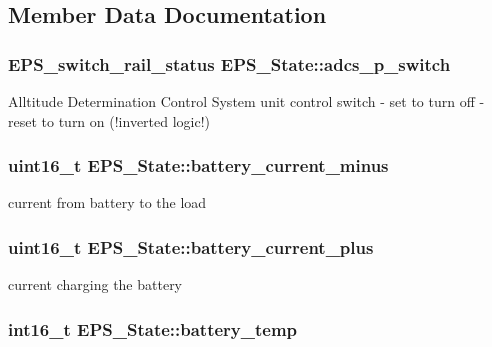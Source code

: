 \subsection{Member Data Documentation}
\hypertarget{struct_e_p_s___state_abe97647e722ffb5a4f04eb99dfe11b75}{
\subsubsection[{adcs\-\_\-p\-\_\-switch}]{\setlength{\rightskip}{0pt plus 5cm}E\-P\-S\-\_\-switch\-\_\-rail\-\_\-status E\-P\-S\-\_\-\-State\-::adcs\-\_\-p\-\_\-switch}}\label{struct_e_p_s___state_abe97647e722ffb5a4f04eb99dfe11b75}
Alltitude Determination Control System unit control switch -\/ set to turn off -\/ reset to turn on (!inverted logic!) \hypertarget{struct_e_p_s___state_ad3b15bd99dc275cedebc984e63fd1838}{
\subsubsection[{battery\-\_\-current\-\_\-minus}]{\setlength{\rightskip}{0pt plus 5cm}uint16\-\_\-t E\-P\-S\-\_\-\-State\-::battery\-\_\-current\-\_\-minus}}\label{struct_e_p_s___state_ad3b15bd99dc275cedebc984e63fd1838}
current from battery to the load \hypertarget{struct_e_p_s___state_aa252bb52b29b61764a4922003a6f2f10}{
\subsubsection[{battery\-\_\-current\-\_\-plus}]{\setlength{\rightskip}{0pt plus 5cm}uint16\-\_\-t E\-P\-S\-\_\-\-State\-::battery\-\_\-current\-\_\-plus}}\label{struct_e_p_s___state_aa252bb52b29b61764a4922003a6f2f10}
current charging the battery \hypertarget{struct_e_p_s___state_a4df91df2e72e6b2a80770a699f329781}{
\subsubsection[{battery\-\_\-temp}]{\setlength{\rightskip}{0pt plus 5cm}int16\-\_\-t E\-P\-S\-\_\-\-State\-::battery\-\_\-temp}}\label{struct_e_p_s___state_a4df91df2e72e6b2a80770a699f329781}
